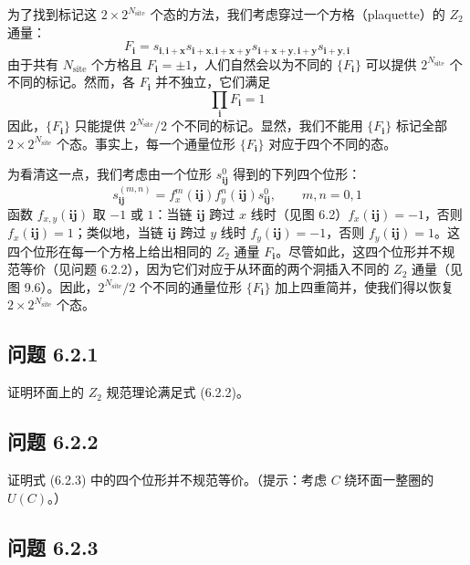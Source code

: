 为了找到标记这 $2 \times 2^{N_{\text{site}}}$ 个态的方法，我们考虑穿过一个方格（plaquette）的 $Z_2$ 通量：
\begin{equation*}
F_{\pmb{i}} = s_{\pmb{i},\pmb{i}+\pmb{x}} s_{\pmb{i}+\pmb{x},\pmb{i}+\pmb{x}+\pmb{y}} s_{\pmb{i}+\pmb{x}+\pmb{y},\pmb{i}+\pmb{y}} s_{\pmb{i}+\pmb{y},\pmb{i}}
\end{equation*}
由于共有 $N_{\text{site}}$ 个方格且 $F_{\pmb{i}} = \pm 1$，人们自然会以为不同的 $\{F_{\pmb{i}}\}$ 可以提供 $2^{N_{\text{site}}}$ 个不同的标记。然而，各 $F_{\pmb{i}}$ 并不独立，它们满足
\begin{equation*}
\prod_{\pmb{i}} F_{\pmb{i}} = 1\tag{6.2.2}
\end{equation*}
因此，$\{F_{\pmb{i}}\}$ 只能提供 $2^{N_{\text{site}}}/2$ 个不同的标记。显然，我们不能用 $\{F_{\pmb{i}}\}$ 标记全部 $2 \times 2^{N_{\text{site}}}$ 个态。事实上，每一个通量位形 $\{F_{\pmb{i}}\}$ 对应于四个不同的态。

为看清这一点，我们考虑由一个位形 $s^0_{\pmb{ij}}$ 得到的下列四个位形：
\begin{equation*}
s^{(m,n)}_{\pmb{ij}} = f_x^m(\pmb{ij}) f_y^n(\pmb{ij}) s^0_{\pmb{ij}}, \qquad m, n = 0, 1\tag{6.2.3}
\end{equation*}
函数 $f_{x,y}(\pmb{ij})$ 取 $-1$ 或 $1$：当链 $\pmb{ij}$ 跨过 $x$ 线时（见图 6.2）$f_x(\pmb{ij}) = -1$，否则 $f_x(\pmb{ij}) = 1$；类似地，当链 $\pmb{ij}$ 跨过 $y$ 线时 $f_y(\pmb{ij}) = -1$，否则 $f_y(\pmb{ij}) = 1$。这四个位形在每一个方格上给出相同的 $Z_2$ 通量 $F_{\pmb{i}}$。尽管如此，这四个位形并不规范等价（见问题 6.2.2），因为它们对应于从环面的两个洞插入不同的 $Z_2$ 通量（见图 9.6）。因此，$2^{N_{\text{site}}}/2$ 个不同的通量位形 $\{F_{\pmb{i}}\}$ 加上四重简并，使我们得以恢复 $2 \times 2^{N_{\text{site}}}$ 个态。

\subsection*{问题 6.2.1}

证明环面上的 $Z_2$ 规范理论满足式 (6.2.2)。

\subsection*{问题 6.2.2}

证明式 (6.2.3) 中的四个位形并不规范等价。（提示：考虑 $C$ 绕环面一整圈的 $U(C)$。）

\subsection*{问题 6.2.3}

